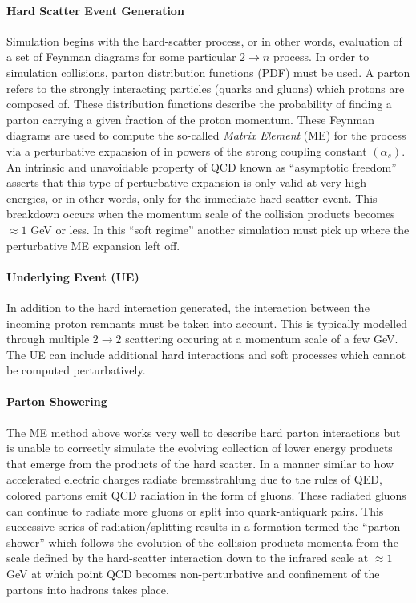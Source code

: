 \paragraph{\textbf{Hard Scatter Event Generation}}
Simulation begins with the hard-scatter process, or in other words, evaluation of a set of Feynman diagrams for some particular $2 \rightarrow n$ process.
In order to simulation collisions, parton distribution functions (PDF) must be used.
A parton refers to the strongly interacting particles (quarks and gluons) which protons are composed of.
These distribution functions describe the probability of finding a parton carrying a given fraction of the proton momentum.
These Feynman diagrams are used to compute the so-called \textit{Matrix Element} (ME) for the process via a perturbative expansion of in powers of the strong coupling constant $(\alpha_s)$.
An intrinsic and unavoidable property of QCD known as ``asymptotic freedom'' asserts that this type of perturbative expansion is only valid at very high energies, or in other words, only for the immediate hard scatter event.
This breakdown occurs when the momentum scale of the collision products becomes $\approx 1$ GeV or less.
In this ``soft regime'' another simulation must pick up where the perturbative ME expansion left off.

\paragraph{\textbf{Underlying Event (UE)}}
In addition to the hard interaction generated, the interaction between the incoming proton remnants must be taken into account.
This is typically modelled through multiple $2 \rightarrow 2$ scattering occuring at a momentum scale of a few GeV.
The UE can include additional hard interactions and soft processes which cannot be computed perturbatively.

\paragraph{\textbf{Parton Showering}}
The ME method above works very well to describe hard parton interactions but is unable to correctly simulate the evolving collection of lower energy products that emerge from the products of the hard scatter.
In a manner similar to how accelerated electric charges radiate bremsstrahlung due to the rules of QED, colored partons emit QCD radiation in the form of gluons.
These radiated gluons can continue to radiate more gluons or split into quark-antiquark pairs.
This successive series of radiation/splitting results in a formation termed the ``parton shower'' which follows the evolution of the collision products momenta from the scale defined by the hard-scatter interaction down to the infrared scale at $\approx 1$ GeV at which point QCD becomes non-perturbative and confinement of the partons into hadrons takes place.

